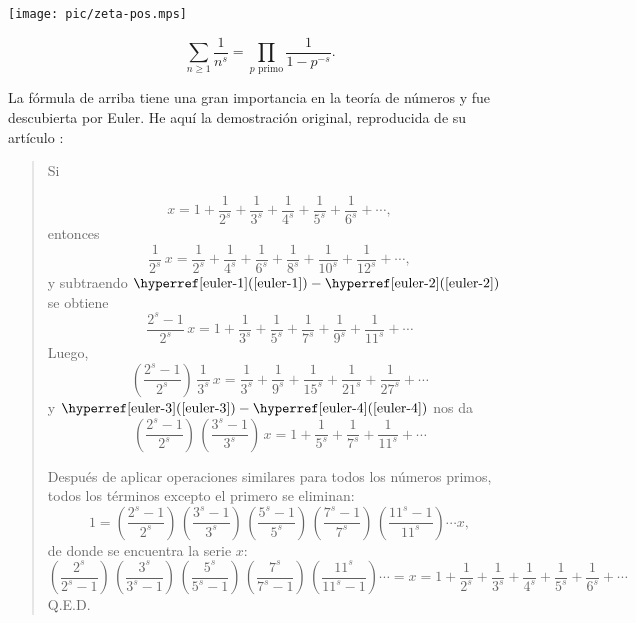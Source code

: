\documentclass{article}
\numberwithin{equation}{section}
\theoremstyle{definition}
\begin{document}
\begin{center}
  \texttt{[image: pic/zeta-pos.mps]}
\end{center}

\begin{teorema}
  $$\sum_{n \ge 1} \frac{1}{n^s} = \prod_{p\text{ primo}} \frac{1}{1 - p^{-s}}.$$
\end{teorema}

La fórmula de arriba tiene una gran importancia en la teoría de números y fue
descubierta por Euler. He aquí la demostración original, reproducida de su
artículo \cite{E72}:

\begin{quote}
  Si

  \begin{equation}
    \label{euler-1}
    x = 1 + \frac{1}{2^s} + \frac{1}{3^s} + \frac{1}{4^s} + \frac{1}{5^s} + \frac{1}{6^s} + \cdots,
  \end{equation}
  entonces
  \begin{equation}
    \label{euler-2}
    \frac{1}{2^s}\,x = \frac{1}{2^s} + \frac{1}{4^s} + \frac{1}{6^s} + \frac{1}{8^s} + \frac{1}{10^s} + \frac{1}{12^s} + \cdots,
  \end{equation}
  y subtraendo $\text{\eqnref{euler-1}}-\text{\eqnref{euler-2}}$ se obtiene
  \begin{equation}
    \label{euler-3}
    \frac{2^s - 1}{2^s}\,x = 1 + \frac{1}{3^s} + \frac{1}{5^s} + \frac{1}{7^s} + \frac{1}{9^s} + \frac{1}{11^s} + \cdots
  \end{equation}
  Luego,
  \begin{equation}
    \label{euler-4}
    \left(\frac{2^s - 1}{2^s}\right)\,\frac{1}{3^s}\,x = \frac{1}{3^s} + \frac{1}{9^s} + \frac{1}{15^s} + \frac{1}{21^s} + \frac{1}{27^s} + \cdots
  \end{equation}
  y $\text{\eqnref{euler-3}} - \text{\eqnref{euler-4}}$ nos da
  \[ \left(\frac{2^s - 1}{2^s}\right)\,\left(\frac{3^s - 1}{3^s}\right)\,x = 1 + \frac{1}{5^s} + \frac{1}{7^s} + \frac{1}{11^s} + \cdots \]

  Después de aplicar operaciones similares para todos los números primos, todos
  los términos excepto el primero se eliminan:
  $$1 = \left(\frac{2^s - 1}{2^s}\right)\,\left(\frac{3^s - 1}{3^s}\right)\,\left(\frac{5^s - 1}{5^s}\right)\,\left(\frac{7^s - 1}{7^s}\right)\,\left(\frac{11^s - 1}{11^s}\right)\cdots x,$$
  de donde se encuentra la serie $x$:
  $$\left(\frac{2^s}{2^s - 1}\right)\,\left(\frac{3^s}{3^s - 1}\right)\,\left(\frac{5^s}{5^s - 1}\right)\,\left(\frac{7^s}{7^s - 1}\right)\,\left(\frac{11^s}{11^s - 1}\right)\cdots = x = 1 + \frac{1}{2^s} + \frac{1}{3^s} + \frac{1}{4^s} + \frac{1}{5^s} + \frac{1}{6^s} + \cdots$$
  Q.E.D.
\end{quote}
\end{document}
